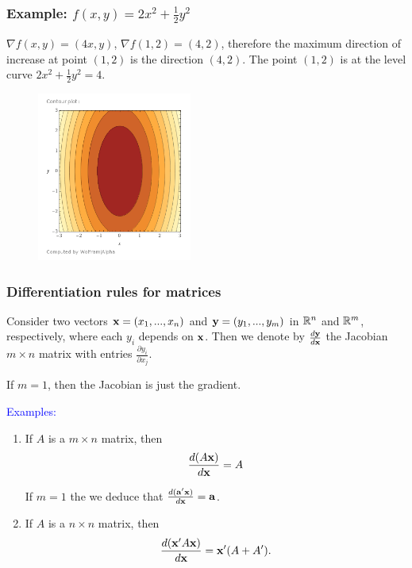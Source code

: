 \documentclass[11pt,aspectratio=169]{beamer}
\begin{document}
\begin{frame}
\frametitle{Example: $f(x,y)=2x^2+\frac12 y^2$}
\begin{small}$\nabla f(x,y)=(4x, y)$, $\nabla f(1,2)=(4, 2)$, therefore the maximum direction of increase at point $(1,2)$ is the direction $(4,2)$. 
\vskip 10pt
The point $(1,2)$ is at the level curve $2x^2+\frac12y^2=4$.\end{small}
\begin{figure}
\includegraphics[width=2in]{img/level_ex} 
\end{figure}
\end{frame}

\begin{frame}
\frametitle{Differentiation rules for matrices}
\begin{small}
Consider two vectors ${\bf x}=(x_1,...,x_n)$ and ${\bf y}=(y_1,...,y_m)$ in $\mathbb R^n$ and $\mathbb R^m$, respectively, where each $y_i$ depends on ${\bf x}$. Then we denote by $
\frac{d {\bf y}}{d {\bf x}}$
the Jacobian $m \times n$ matrix with entries $\frac{\partial y_i}{\partial x_j}$.

\begin{tiny} If $m=1$, then the Jacobian is just the gradient.\end{tiny}

\vskip 12pt
\textcolor{blue}{Examples:}

\begin{enumerate}
\item If $A$ is a $m \times n$ matrix, then
$$
\frac{d (A {\bf x})}{d{\bf x}}=A
$$

\begin{tiny} If $m=1$ the we deduce that $\frac{d ({\bf a}'{\bf x})}{d{\bf x}}={\bf a}$.\end{tiny}

\item If $A$ is a $n \times n$ matrix, then
$$
\frac{d ({\bf x}'A{\bf x})}{d{\bf x}}={\bf x}'(A+A').
$$
\end{enumerate}
\end{small}
\end{frame}
\end{document}
